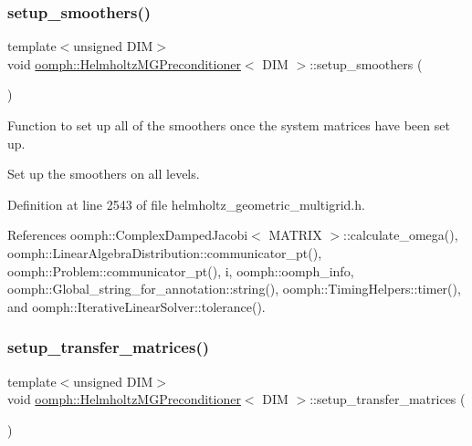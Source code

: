\mbox{\label{classoomph_1_1HelmholtzMGPreconditioner_a8e6345b2fd41602dd6a91e9bcecf718c}} 
\subsubsection{\texorpdfstring{setup\+\_\+smoothers()}{setup\_smoothers()}}
{\footnotesize\ttfamily template$<$unsigned D\+IM$>$ \\
void \hyperlink{classoomph_1_1HelmholtzMGPreconditioner}{oomph\+::\+Helmholtz\+M\+G\+Preconditioner}$<$ D\+IM $>$\+::setup\+\_\+smoothers (\begin{DoxyParamCaption}{ }\end{DoxyParamCaption})\hspace{0.3cm}{\ttfamily [private]}}



Function to set up all of the smoothers once the system matrices have been set up. 

Set up the smoothers on all levels. 

Definition at line 2543 of file helmholtz\+\_\+geometric\+\_\+multigrid.\+h.



References oomph\+::\+Complex\+Damped\+Jacobi$<$ M\+A\+T\+R\+I\+X $>$\+::calculate\+\_\+omega(), oomph\+::\+Linear\+Algebra\+Distribution\+::communicator\+\_\+pt(), oomph\+::\+Problem\+::communicator\+\_\+pt(), i, oomph\+::oomph\+\_\+info, oomph\+::\+Global\+\_\+string\+\_\+for\+\_\+annotation\+::string(), oomph\+::\+Timing\+Helpers\+::timer(), and oomph\+::\+Iterative\+Linear\+Solver\+::tolerance().

\mbox{\label{classoomph_1_1HelmholtzMGPreconditioner_a8a02de0cfbfcf01aabb7201aeaf0fd85}} 
\subsubsection{\texorpdfstring{setup\+\_\+transfer\+\_\+matrices()}{setup\_transfer\_matrices()}}
{\footnotesize\ttfamily template$<$unsigned D\+IM$>$ \\
void \hyperlink{classoomph_1_1HelmholtzMGPreconditioner}{oomph\+::\+Helmholtz\+M\+G\+Preconditioner}$<$ D\+IM $>$\+::setup\+\_\+transfer\+\_\+matrices (\begin{DoxyParamCaption}{ }\end{DoxyParamCaption})}



